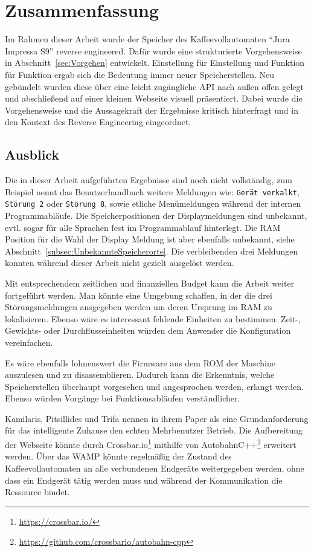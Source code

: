 \chapter{Zusammenfassung}\label{ch:Zusammenfassung}
Im Rahmen dieser Arbeit wurde der Speicher des Kaffeevollautomaten "`Jura Impressa S9"' reverse engineered.
Dafür wurde eine strukturierte Vorgehensweise in Abschnitt~\ref{sec:Vorgehen} entwickelt.
Einstellung für Einstellung und Funktion für Funktion ergab sich die Bedeutung immer neuer Speicherstellen.
Neu gebündelt wurden diese über eine leicht zugängliche \ac{API} nach außen offen gelegt und abschließend auf einer kleinen Webseite visuell präsentiert.
Dabei wurde die Vorgehensweise und die Aussagekraft der Ergebnisse kritisch hinterfragt und in den Kontext des Reverse Engineering eingeordnet.

\section{Ausblick}
Die in dieser Arbeit aufgeführten Ergebnisse sind noch nicht vollständig, zum Beispiel nennt das Benutzerhandbuch weitere Meldungen wie:\label{FehlendeMeldungen}
\texttt{Gerät verkalkt}, \texttt{Störung 2} oder \texttt{Störung 8}, sowie etliche Menümeldungen während der internen Programmabläufe.
Die Speicherpositionen der Displaymeldungen sind unbekannt, evtl. sogar für alle Sprachen fest im Programmablauf hinterlegt.
Die \ac{RAM} Position für die Wahl der Display Meldung ist aber ebenfalls unbekannt, siehe Abschnitt~\ref{subsec:UnbekannteSpeicherorte}. 
Die verbleibenden drei Meldungen konnten während dieser Arbeit nicht gezielt ausgelöst werden.

Mit entsprechendem zeitlichen und finanziellen Budget kann die Arbeit weiter fortgeführt werden.
Man könnte eine Umgebung schaffen, in der die drei Störungsmeldungen ausgegeben werden um deren Ursprung im \ac{RAM} zu lokalisieren.
Ebenso wäre es interessant fehlende Einheiten zu bestimmen.
Zeit-, Gewichts- oder Durchflusseinheiten würden dem Anwender die Konfiguration vereinfachen.

Es wäre ebenfalls lohnenswert die Firmware aus dem \ac{ROM} der Maschine auszulesen und zu disassemblieren.
Dadurch kann die Erkenntnis, welche Speicherstellen überhaupt vorgesehen und angesprochen werden, erlangt werden.
Ebenso würden Vorgänge bei Funktionsabläufen verständlicher.

Kamilaris, Pitsillides und Trifa nennen in ihrem Paper \cite{Kamilaris2011} als eine Grundanforderung für das intelligente Zuhause den echten Mehrbenutzer Betrieb.
Die Aufbereitung der Webseite könnte durch Crossbar.io\footnote{\url{https://crossbar.io/}} mithilfe von AutobahnC++\footnote{\url{https://github.com/crossbario/autobahn-cpp}} erweitert werden.
Über das \ac{WAMP} könnte regelmäßig der Zustand des Kaffeevollautomaten an alle verbundenen Endgeräte weitergegeben werden, ohne dass ein Endgerät tätig werden muss und während der Kommunikation die Ressource bindet.
